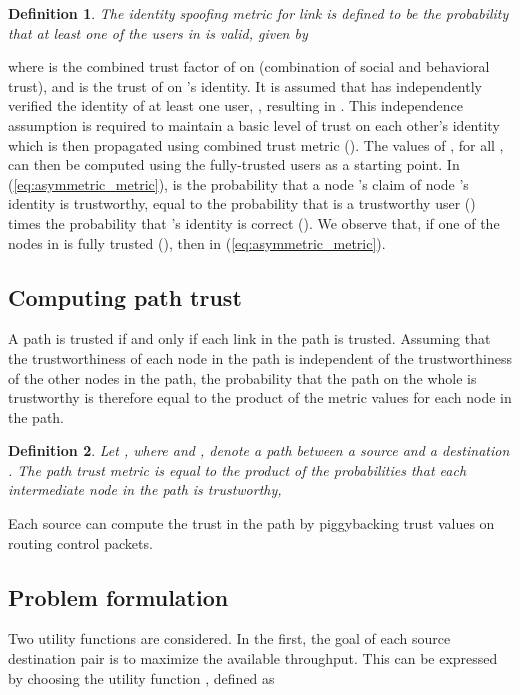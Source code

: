 \documentclass[conference]{IEEEtran}
\newtheorem{definition}{Definition}
\begin{document}
\begin{definition}
\label{def:asymmetric_metric}
The \emph{identity spoofing metric}  for link  is defined to be the probability that
at least one of the users in  is valid, given by

\end{definition}
where  is the combined trust factor of  on  (combination of social and behavioral trust), and  is the trust of  on 's identity. It is assumed that  has independently verified the identity of at least one user, , resulting in . This independence assumption is required to maintain a basic level of trust on each other's identity which is then propagated using combined trust metric (). The values of , for all , can then be computed using the fully-trusted users as a starting point.
 In (\ref{eq:asymmetric_metric}),  is the probability that a node 's claim of node 's identity is trustworthy, equal to the probability that  is a trustworthy user () times the probability that 's identity is correct (). We observe that, if one of the nodes in  is fully trusted (), then  in (\ref{eq:asymmetric_metric}).


\subsection{Computing path trust}
\label{subsec:path_trust}
 A path is trusted if and only if each link in the path is trusted.  Assuming that the trustworthiness of each node  in the path is independent of the trustworthiness of the other nodes in the path, the probability that the path on the whole is trustworthy is therefore equal to the product of the metric values for each node in the path.
\begin{definition}
\label{def:path_key_vulnerability}
Let , where  and , denote a path between a source  and a destination .  The  path trust metric 
is  equal to the product of the probabilities that each intermediate node in the path is trustworthy,


\end{definition}
Each source can compute the trust in the path by piggybacking trust values on routing control packets.

\subsection{Problem formulation}
\label{subsec:centralized}
Two utility functions are considered.  In the first, the goal of each source destination pair  is to maximize the available throughput. This can be expressed by choosing the utility function , defined as
\end{document}
